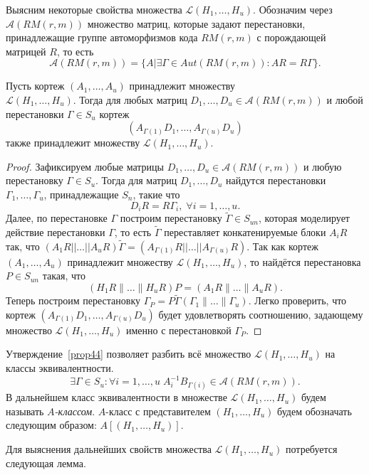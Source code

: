 Выясним некоторые свойства множества $\mathcal L(H_1,\ldots,H_u)$.
Обозначим через\\ $\mathcal A(RM(r,m))$ множество матриц, которые
задают перестановки, принадлежащие группе автоморфизмов кода
$RM(r,m)$ с порождающей матрицей $R$, то есть
$$
\mathcal A(RM(r,m))=\{A|\exists \Gamma\in Aut(RM(r,m)):
AR=R\Gamma\}.
$$
\begin{proposition} \label{prop44}
Пусть кортеж $(A_1,\ldots,A_u)$ принадлежит множеству\\ $\mathcal
L(H_1,\ldots,H_u)$. Тогда для любых матриц $D_1,\ldots,D_u\in
\mathcal A(RM(r,m))$ и любой перестановки $\Gamma\in S_u$ кортеж
$$
(A_{\Gamma(1)}D_1,\ldots,A_{\Gamma(u)}D_u)
$$
также принадлежит множеству $\mathcal L(H_1,\ldots,H_u)$.
\end{proposition}
\begin{proof} Зафиксируем любые матрицы $D_1,\ldots,D_u\in
\mathcal A(RM(r,m))$ и любую перестановку $\Gamma\in S_u$. Тогда
для матриц $D_1,\ldots,D_u$ найдутся перестановки
$\Gamma_1,\ldots,\Gamma_u$, принадлежащие $S_n$, такие что
$$
D_iR=R\Gamma_i,\;\forall i=1,\ldots,u.
$$
Далее, по перестановке $\Gamma$ построим перестановку
$\widetilde\Gamma\in S_{un}$, которая моделирует действие
перестановки $\Gamma$, то есть $\widetilde\Gamma$ переставляет
конкатенируемые блоки $A_i R$ так, что $(A_1 R||\ldots||A_u
R)\widetilde\Gamma=(A_{\Gamma(1)} R||\ldots||A_{\Gamma(u)} R)$.
Так как кортеж $(A_1,\ldots,A_u)$ принадлежит множеству $\mathcal
L(H_1,\ldots,H_u)$, то найдётся перестановка $P\in S_{un}$ такая,
что
$$
(H_1R\|\ldots\|H_uR)P=(A_1R\|\ldots\|A_uR).
$$
Теперь построим перестановку
$\Gamma_P=P\widetilde\Gamma(\Gamma_1\|\ldots\|\Gamma_u)$. Легко
проверить, что кортеж $(A_{\Gamma(1)}D_1,\ldots,A_{\Gamma(u)}D_u)$
будет удовлетворять соотношению, задающему множество $\mathcal
L(H_1,\ldots,H_u)$ именно с перестановкой $\Gamma_P$.
\end{proof}
Утверждение~\ref{prop44} позволяет разбить всё множество $\mathcal
L(H_1,\ldots,H_u)$ на классы эквивалентности. 
$$
\exists \Gamma\in S_{u}:\forall
i=1,\ldots,u\;A^{-1}_iB_{\Gamma(i)}\in\mathcal A(RM(r,m)).
$$
В дальнейшем класс эквивалентности в множестве $\mathcal
L(H_1,\ldots,H_u)$ будем называть \emph{$A$-классом}. $A$-класс с
представителем $(H_1,\ldots,H_u)$ будем обозначать следующим
образом: $A[(H_1,\ldots,H_u)]$.

Для выяснения дальнейших свойств множества $\mathcal
L(H_1,\ldots,H_u)$ потребуется следующая лемма.

